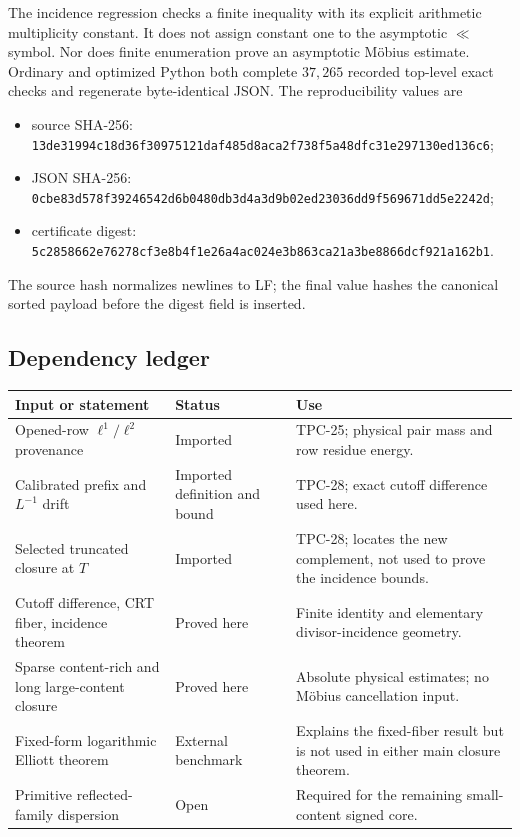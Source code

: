 The incidence regression checks a finite inequality with its explicit
arithmetic multiplicity constant.  It does not assign constant one to
the asymptotic $\ll$ symbol.  Nor does finite enumeration prove an
asymptotic M\"obius estimate.  Ordinary and optimized Python both
complete $37{,}265$ recorded top-level exact checks and regenerate
byte-identical JSON.  The reproducibility values are
\begin{itemize}
 \item source SHA-256:
 \nolinkurl{13de31994c18d36f30975121daf485d8aca2f738f5a48dfc31e297130ed136c6};
 \item JSON SHA-256:
 \nolinkurl{0cbe83d578f39246542d6b0480db3d4a3d9b02ed23036dd9f569671dd5e2242d};
 \item certificate digest:
 \nolinkurl{5c2858662e76278cf3e8b4f1e26a4ac024e3b863ca21a3be8866dcf921a162b1}.
\end{itemize}
The source hash normalizes newlines to LF; the final value hashes the
canonical sorted payload before the digest field is inserted.

\subsection{Dependency ledger}

\begin{center}
\begin{tabular}{>{\raggedright\arraybackslash}p{}
                >{\raggedright\arraybackslash}p{}
                >{\raggedright\arraybackslash}p{}}
\toprule
Input or statement & Status & Use \\
\midrule
Opened-row $\ell^1/\ell^2$ provenance
& Imported & TPC-25; physical pair mass and row residue energy. \\
\addlinespace
Calibrated prefix and $L^{-1}$ drift
& Imported definition and bound & TPC-28; exact cutoff difference used here. \\
\addlinespace
Selected truncated closure at $T$
& Imported & TPC-28; locates the new complement, not used to prove the
incidence bounds. \\
\addlinespace
Cutoff difference, CRT fiber, incidence theorem
& Proved here & Finite identity and elementary divisor-incidence
geometry. \\
\addlinespace
Sparse content-rich and long large-content closure
& Proved here & Absolute physical estimates; no M\"obius cancellation
input. \\
\addlinespace
Fixed-form logarithmic Elliott theorem
& External benchmark & Explains the fixed-fiber result but is not used
in either main closure theorem. \\
\addlinespace
Primitive reflected-family dispersion
& Open & Required for the remaining small-content signed core. \\
\bottomrule
\end{tabular}
\end{center}

